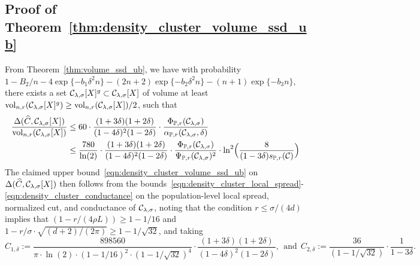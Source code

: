 \subsection{Proof of Theorem~\ref{thm:density_cluster_volume_ssd_ub}}
From Theorem~\ref{thm:volume_ssd_ub}, we have with probability $1 - B_2/n - 4\exp\{-b_1\delta^2n\} - (2n + 2)\exp\{-b_2\delta^2n\} - (n + 1)\exp\{-b_3n\}$, there exists a set $\mathcal{C}_{\lambda,\sigma}[X]^g \subset \mathcal{C}_{\lambda,\sigma}[X]$ of volume at least $\mathrm{vol}_{n,r}(\mathcal{C}_{\lambda,\sigma}[X]^g) \geq \mathrm{vol}_{n,r}(\mathcal{C}_{\lambda,\sigma}[X])/2$, such that
\begin{align*}
\frac{\Delta(\widehat{C},\mathcal{C}_{\lambda,\sigma}[X])}{\mathrm{vol}_{n,r}(\mathcal{C}_{\lambda,\sigma}[X])} & \leq 60 \cdot \frac{(1 + 3\delta)(1 + 2\delta)}{(1 - 4\delta)^2(1 - 2\delta)} \cdot \frac{\Phi_{\mathbb{P},r}(\mathcal{C}_{\lambda,\sigma})}{\alpha_{\mathbb{P},r}(\mathcal{C}_{\lambda,\sigma},\delta)} \\
& \leq \frac{780}{\ln(2)} \cdot \frac{(1 + 3\delta)(1 + 2\delta)}{(1 - 4\delta)^2(1 - 2\delta)} \cdot \frac{\Phi_{\mathbb{P},r}(\mathcal{C}_{\lambda,\sigma})}{\Psi_{\mathbb{P},r}(\mathcal{C}_{\lambda,\sigma})^2} \cdot \ln^2\Bigl(\frac{8}{(1 - 3\delta) s_{\mathbb{P},r}(\mathcal{C})}\Bigr)
\end{align*}
The claimed upper bound~\eqref{eqn:density_cluster_volume_ssd_ub} on $\Delta(\widehat{C},\mathcal{C}_{\lambda,\sigma}[X])$ then follows from the bounds~\eqref{eqn:density_cluster_local_spread}-\eqref{eqn:density_cluster_conductance} on the population-level local spread, normalized cut, and conductance of $\mathcal{C}_{\lambda,\sigma}$, noting that the condition $r \leq \sigma/(4d)$ implies that $(1 - r/(4\rho L)) \geq 1 - 1/16$ and $1 - r/\sigma \cdot \sqrt{(d + 2)/(2\pi)} \geq 1 - 1/\sqrt{32}$, and taking
\begin{equation*}
C_{1,\delta} := \frac{898560}{\pi \cdot \ln(2) \cdot (1 - 1/16)^2 \cdot (1 - 1/\sqrt{32})^4} \cdot \frac{(1 + 3\delta)(1 + 2\delta)}{(1 - 4\delta)^2(1 - 2\delta)},~~\textrm{and}~~C_{2,\delta} := \frac{36}{(1 - 1/\sqrt{32})} \cdot \frac{1}{1-3\delta}.
\end{equation*}

